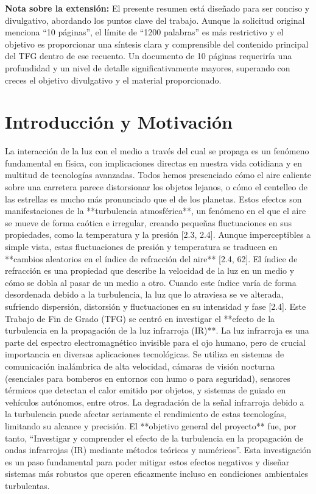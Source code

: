 \textbf{Nota sobre la extensión:} El presente resumen está diseñado para ser conciso y divulgativo, abordando los puntos clave del trabajo. Aunque la solicitud original menciona ``10 páginas'', el límite de ``1200 palabras'' es más restrictivo y el objetivo es proporcionar una síntesis clara y comprensible del contenido principal del TFG dentro de ese recuento. Un documento de 10 páginas requeriría una profundidad y un nivel de detalle significativamente mayores, superando con creces el objetivo divulgativo y el material proporcionado. 

\section{Introducción y Motivación} 

La interacción de la luz con el medio a través del cual se propaga es un fenómeno fundamental en física, con implicaciones directas en nuestra vida cotidiana y en multitud de tecnologías avanzadas. Todos hemos presenciado cómo el aire caliente sobre una carretera parece distorsionar los objetos lejanos, o cómo el centelleo de las estrellas es mucho más pronunciado que el de los planetas. Estos efectos son manifestaciones de la **turbulencia atmosférica**, un fenómeno en el que el aire se mueve de forma caótica e irregular, creando pequeñas fluctuaciones en sus propiedades, como la temperatura y la presión [2.3, 2.4]. Aunque imperceptibles a simple vista, estas fluctuaciones de presión y temperatura se traducen en **cambios aleatorios en el índice de refracción del aire** [2.4, 62]. El índice de refracción es una propiedad que describe la velocidad de la luz en un medio y cómo se dobla al pasar de un medio a otro. Cuando este índice varía de forma desordenada debido a la turbulencia, la luz que lo atraviesa se ve alterada, sufriendo dispersión, distorsión y fluctuaciones en su intensidad y fase [2.4]. Este Trabajo de Fin de Grado (TFG) se centró en investigar el **efecto de la turbulencia en la propagación de la luz infrarroja (IR)**. La luz infrarroja es una parte del espectro electromagnético invisible para el ojo humano, pero de crucial importancia en diversas aplicaciones tecnológicas. Se utiliza en sistemas de comunicación inalámbrica de alta velocidad, cámaras de visión nocturna (esenciales para bomberos en entornos con humo o para seguridad), sensores térmicos que detectan el calor emitido por objetos, y sistemas de guiado en vehículos autónomos, entre otros. La degradación de la señal infrarroja debido a la turbulencia puede afectar seriamente el rendimiento de estas tecnologías, limitando su alcance y precisión. El **objetivo general del proyecto** fue, por tanto, ``Investigar y comprender el efecto de la turbulencia en la propagación de ondas infrarrojas (IR) mediante métodos teóricos y numéricos''. Esta investigación es un paso fundamental para poder mitigar estos efectos negativos y diseñar sistemas más robustos que operen eficazmente incluso en condiciones ambientales turbulentas. 

